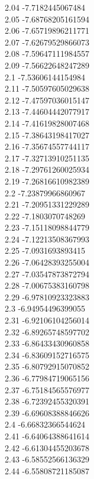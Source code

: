 {2.04	-7.7182445067484\\
2.05	-7.68768205161594\\
2.06	-7.65719896211771\\
2.07	-7.62679529866073\\
2.08	-7.59647111984557\\
2.09	-7.56622648247289\\
2.1	-7.53606144154984\\
2.11	-7.50597605029638\\
2.12	-7.47597036015147\\
2.13	-7.44604442077917\\
2.14	-7.41619828007468\\
2.15	-7.38643198417027\\
2.16	-7.35674557744117\\
2.17	-7.32713910251135\\
2.18	-7.29761260025934\\
2.19	-7.26816610982389\\
2.2	-7.23879966860967\\
2.21	-7.20951331229289\\
2.22	-7.1803070748269\\
2.23	-7.15118098844779\\
2.24	-7.12213508367993\\
2.25	-7.0931693893415\\
2.26	-7.06428393255004\\
2.27	-7.03547873872794\\
2.28	-7.00675383160798\\
2.29	-6.97810923323883\\
2.3	-6.94954496399055\\
2.31	-6.92106104256014\\
2.32	-6.89265748597702\\
2.33	-6.86433430960858\\
2.34	-6.83609152716575\\
2.35	-6.80792915070852\\
2.36	-6.77984719065156\\
2.37	-6.75184565576977\\
2.38	-6.72392455320391\\
2.39	-6.69608388846626\\
2.4	-6.66832366544624\\
2.41	-6.64064388641614\\
2.42	-6.61304455203678\\
2.43	-6.58552566136329\\
2.44	-6.55808721185087\\
}
